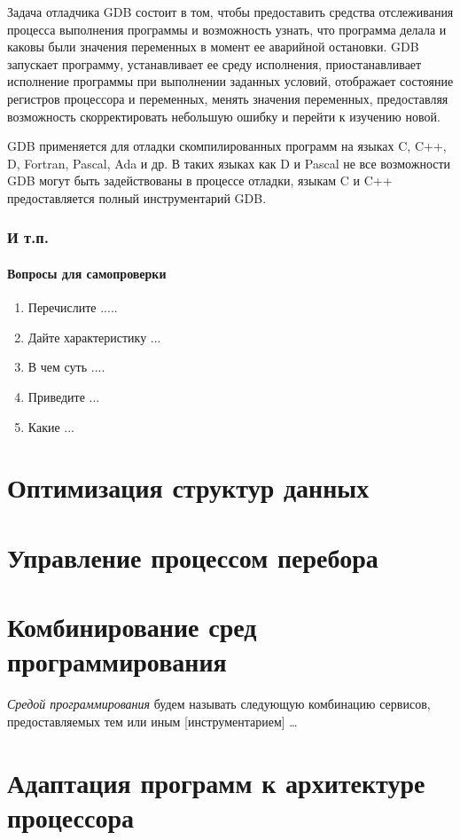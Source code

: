 \documentclass[14pt, a4paper, openany, twoside, final]{extbook} %
\newcommand{\e}[2][fcolor]{\textcolor{pcolor}{[}\textcolor{#1}{#2}\textcolor{pcolor}{]}}
\newenvironment{questions}{\subsubsection*{Вопросы для самопроверки}\begin{enumerate}\itemsep0pt minus 0.3pt\parskip0pt plus 0.3pt}{\end{enumerate}}
\begin{document}
Задача отладчика GDB состоит в том, чтобы предоставить средства отслеживания процесса выполнения программы и возможность узнать, что программа делала и каковы были значения переменных в момент ее аварийной остановки.  GDB запускает программу, устанавливает ее среду исполнения, приостанавливает исполнение программы при выполнении заданных условий, отображает состояние регистров процессора и переменных, менять значения переменных, предоставляя возможность скорректировать небольшую ошибку и перейти к изучению новой.

GDB применяется для отладки скомпилированных программ на языках C, C++, D, Fortran, Pascal, Ada и др.  В таких языках как D и Pascal не все возможности GDB могут быть задействованы в процессе отладки, языкам C и C++ предоставляется полный инструментарий GDB.

\subsection{И т.п.}


\begin{questions}
\item{} Перечислите .....
\item{} Дайте характеристику ...
\item{} В чем суть ....
\item{} Приведите ...
\item{} Какие ...
\end{questions}

\chapter{Оптимизация структур данных}

\chapter{Управление процессом перебора}

\chapter{Комбинирование сред программирования}

\emph{Средой программирования} будем называть следующую комбинацию сервисов, предоставляемых тем или иным \e{инструментарием} \ldots{}

\chapter{Адаптация программ к архитектуре процессора}
\end{document}
